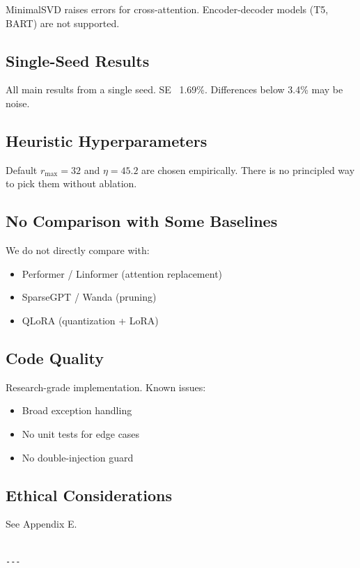 MinimalSVD raises errors for cross-attention. Encoder-decoder models (T5, 
BART) are not supported.

\subsection{Single-Seed Results}

All main results from a single seed. SE ~1.69\%. Differences below 3.4\% may 
be noise.

\subsection{Heuristic Hyperparameters}

Default $r_\text{max} = 32$ and $\eta = 45.2$ are chosen 
empirically. There is no principled way to pick them without ablation.

\subsection{No Comparison with Some Baselines}

We do not directly compare with:
\begin{itemize}
\item Performer / Linformer (attention replacement)
\item SparseGPT / Wanda (pruning)
\item QLoRA (quantization + LoRA)

\end{itemize}
\subsection{Code Quality}

Research-grade implementation. Known issues:
\begin{itemize}
\item Broad exception handling
\item No unit tests for edge cases
\item No double-injection guard

\end{itemize}
\subsection{Ethical Considerations}

See Appendix E.
\begin{lstlisting}

---
\end{lstlisting}